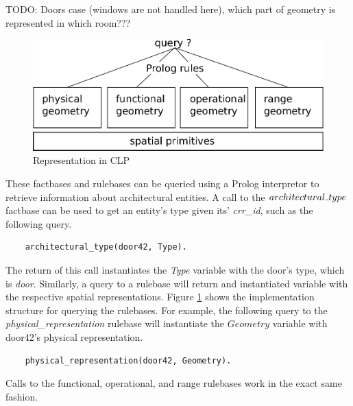 \documentclass[12pt]{ucthesis}
\begin{document}
TODO: Doors case (windows are not handled here), which part of geometry is represented in which room???

\begin{figure}[H]
\centering
\includegraphics[width=120mm]{clp-design}
\caption{Representation in CLP}
\label{clp-design}
\end{figure}

These factbases and rulebases can be queried using a Prolog interpretor to retrieve information about architectural entities. A call to the $architectural \mathunderscore type$ factbase can be used to get an entity's type given its' \emph{crr\_id}, such as the following query.
\begin{verbatim}
    architectural_type(door42, Type).
\end{verbatim} The return of this call instantiates the \emph{Type} variable with the door's type, which is \emph{door}. Similarly, a query to a rulebase will return and instantiated variable with the respective spatial representations. Figure \ref{clp-design} shows the implementation structure for querying the rulebases. For example, the following query to the \emph{physical\_representation} rulebase will instantiate the $Geometry$ variable with door42's physical representation. \begin{verbatim}
    physical_representation(door42, Geometry).
\end{verbatim} Calls to the functional, operational, and range rulebases work in the exact same fashion.



\end{document}
